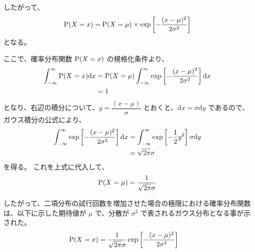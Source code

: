 \documentclass[11pt]{jsarticle}
\newcommand{\diff}{\mathrm d}
\begin{document}
\begin{appendix}
したがって、
\begin{equation}
{\rm P}(X=x) = {\rm P}(X=\mu) \times \exp \left[-\dfrac{(x-\mu)^2}{2 \sigma^2} \right]
\end{equation}
となる。

ここで、確率分布関数 ${\rm P}(X=x)$ の規格化条件より、
\begin{align}
\int_{-\infty}^{\infty} {\rm P}(X=x) \diff x 
	&= {\rm P}(X=\mu) \int_{-\infty}^{\infty} \exp \left[-\dfrac{(x-\mu)^2}{2 \sigma^2} \right] \diff x \notag \\
	&= 1
\end{align}
となり、右辺の積分について、$y=\dfrac{(x-\mu)}{\sigma}$ とおくと、$\diff x = \sigma \diff y$ であるので、ガウス積分の公式により、
\begin{align}
\int_{-\infty}^{\infty} \exp \left[-\dfrac{(x-\mu)^2}{2 \sigma^2} \right] \diff x 
	&= \int_{-\infty}^{\infty} \exp \left[- \dfrac{1}{2} y^2 \right] \sigma \diff y \notag \\
	&= \sqrt{2 \pi} \sigma
\end{align}
を得る。
これを上式に代入して、
\begin{align}
{\rm P}(X=\mu) = \dfrac{1}{\sqrt{2 \pi} \sigma}
\end{align}

したがって、二項分布の試行回数を増加させた場合の極限における確率分布関数は、以下に示した期待値が $\mu$ で、分散が $\sigma^2$ で表されるガウス分布となる事が示された。
\begin{align}
{\rm P}(X=x) 
	&= \dfrac{1}{\sqrt{2 \pi} \sigma} \exp \left[-\dfrac{(x-\mu)^2}{2 \sigma^2} \right]
\end{align}


\end{appendix}
\end{document}
